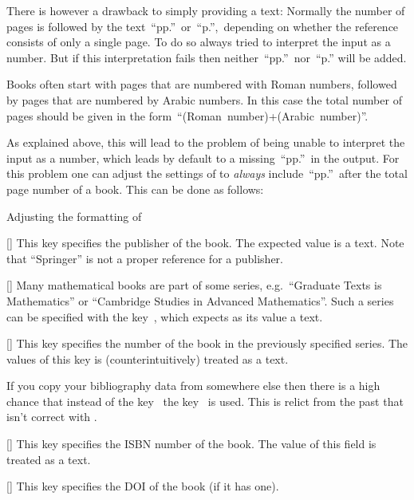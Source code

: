\begin{mydescription}
    There is however a drawback to simply providing a text:
    Normally the number of pages is followed by the text~\enquote{pp.}\ or~\enquote{p.},\ depending on whether the reference consists of only a single page.
    To do so  always tried to interpret the input as a number.
    But if this interpretation fails then neither~\enquote{pp.}\ nor~\enquote{p.} will be added.

    Books often start with pages that are numbered with Roman numbers, followed by pages that are numbered by Arabic numbers.
    In this case the total number of pages should be given in the form~\enquote{(Roman~number)+(Arabic~number)}.

    As explained above, this will lead to the problem of  being unable to interpret the input as a number, which leads by default to a missing~\enquote{pp.}\ in the output.
    For this problem one can adjust the settings of  to \emph{always} include~\enquote{pp.}\ after the total page number of a book.
    This can be done as follows:
    \begin{showcode}{Adjusting the formatting of~}
    \end{showcode}
  \item[\optname{publisher}]
    [\optname]
    This key specifies the publisher of the book.
    The expected value is a text.
    Note that \enquote{Springer} is not a proper reference for a publisher.
  \item[\optname{series}]
    [\optname]
    Many mathematical books are part of some series, e.g.\ \enquote{Graduate Texts is Mathematics} or \enquote{Cambridge Studies in Advanced Mathematics}.
    Such a series can be specified with the key~, which expects as its value a text.
  \item[\optname{number}]
    [\optname]
    This key specifies the number of the book in the previously specified series.
    The values of this key is (counterintuitively) treated as a text.
    
    If you copy your bibliography data from somewhere else then there is a high chance that instead of the key~ the key~ is used.
    This is relict from the past that isn’t correct with .
  \item[\optname{isbn}]
    [\optname]
    This key specifies the ISBN number of the book.
    The value of this field is treated as a text.
  \item[\optname{doi}]
    [\optname]
    This key specifies the DOI of the book (if it has one).
\end{mydescription}

